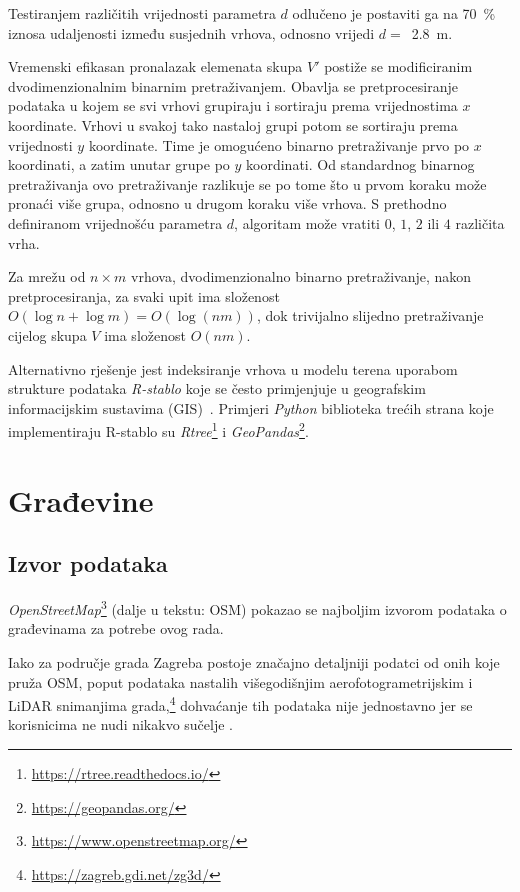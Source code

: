 \documentclass[times, utf8, zavrsni, numeric]{fer}
\begin{document}
		Testiranjem različitih vrijednosti parametra $d$ odlučeno je postaviti ga na \SI{70}{\percent} iznosa udaljenosti između susjednih vrhova, odnosno vrijedi $d=$~\SI{2.8}{\meter}.
		
		Vremenski efikasan pronalazak elemenata skupa $V'$ postiže se modificiranim dvodimenzionalnim binarnim pretraživanjem.
		Obavlja se pretprocesiranje podataka u kojem se svi vrhovi grupiraju i sortiraju prema vrijednostima $x$ koordinate.
		Vrhovi u svakoj tako nastaloj grupi potom se sortiraju prema vrijednosti $y$ koordinate.
		Time je omogućeno binarno pretraživanje prvo po $x$ koordinati, a zatim unutar grupe po $y$ koordinati.
		Od standardnog binarnog pretraživanja ovo pretraživanje razlikuje se po tome što u prvom koraku može pronaći više grupa, odnosno u drugom koraku više vrhova.
		S prethodno definiranom vrijednošću parametra $d$, algoritam može vratiti $0$, $1$, $2$ ili $4$ različita vrha.
		
		Za mrežu od $n \times m$ vrhova, dvodimenzionalno binarno pretraživanje, nakon pretprocesiranja, za svaki upit ima složenost $O(\log n + \log m) = O(\log(nm))$, dok trivijalno slijedno pretraživanje cijelog skupa $V$ ima složenost $O(nm)$.
		
		Alternativno rješenje jest indeksiranje vrhova u modelu terena uporabom strukture podataka \textit{R-stablo} koje se često primjenjuje u geografskim informacijskim sustavima (GIS)~\cite{wiki:rtree}.
		Primjeri \textit{Python} biblioteka trećih strana koje implementiraju R-stablo su \mbox{\textit{Rtree}}\footnote{\url{https://rtree.readthedocs.io/}} i \mbox{\textit{GeoPandas}}\footnote{\url{https://geopandas.org/}}.



\chapter{Građevine}
	
	\section{Izvor podataka}
	
		\textit{OpenStreetMap}\footnote{\url{https://www.openstreetmap.org/}} (dalje u tekstu: OSM) pokazao se najboljim izvorom podataka o građevinama za potrebe ovog rada.
		
		Iako za područje grada Zagreba postoje značajno detaljniji podatci od onih koje pruža OSM, poput podataka nastalih višegodišnjim aerofotogrametrijskim i LiDAR snimanjima grada,\footnote{\url{https://zagreb.gdi.net/zg3d/}} dohvaćanje tih podataka nije jednostavno jer se korisnicima ne nudi nikakvo sučelje .
		
\end{document}
